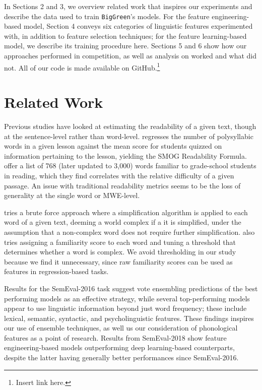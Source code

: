\documentclass[11pt,a4paper]{article}
\begin{document}
In Sections 2 and 3, we overview related work that inspires our experiments and describe the data used to train \texttt{BigGreen}'s models. For the feature engineering-based model, Section 4 conveys six categories of linguistic features experimented with, in addition to feature selection techniques; for the feature learning-based model, we describe its training procedure here. Sections 5 and 6 show how our approaches performed in competition, as well as analysis on worked and what did not. All of our code is made available on GitHub.\footnote{Insert link here.}

\section{Related Work}

Previous studies have looked at estimating the readability of a given text, though at the sentence-level rather than word-level. \citet{10.2307/40011226} regresses the number of polysyllabic words in a given lesson against the mean score for students quizzed on information pertaining to the lesson, yielding the SMOG Readability Formula. \citet{10.2307/1473169} offer a list of 768 (later updated to 3,000) words familiar to grade-school students in reading, which they find correlates with the relative difficulty of a given passage. An issue with traditional readability metrics seems to be the loss of generality at the single word or MWE-level.

\citet{shardlow2013comparison} tries a brute force approach where a simplification algorithm is applied to each word of a given text, deeming a world complex if a it is simplified, under the assumption that a non-complex word does not require further simplification. \citet{shardlow2013comparison} also tries assigning a familiarity score to each word and tuning a threshold that determines whether a word is complex. We avoid thresholding in our study because we find it unnecessary, since raw familiarity scores can be used as features in regression-based tasks. 

Results for the SemEval-2016 task \citep{zampieriEtAl:2017:NLPTEA} suggest vote ensembling predictions of the best performing models as an effective strategy, while several top-performing models \citep{paetzoldspecia2016sv000gg, ronzanoetal2016taln, mukherjeeetal2016ju} appear to use linguistic information beyond just word frequency; these include lexical, semantic, syntactic, and psycholinguistic features. These findings inspires our use of ensemble techniques, as well us our consideration of phonological features as a point of research. Results from SemEval-2018 show feature engineering-based models outperforming deep learning-based counterparts, despite the latter having generally better performances since SemEval-2016.
\end{document}
